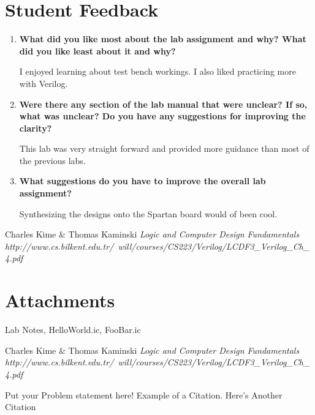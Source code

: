\documentclass[a4paper,12pt]{article}
\begin{document}
\section*{Student Feedback}

\begin{enumerate}
  \item \textbf{What did you like most about the lab assignment and why? What did you like least about it and why?}

  I enjoyed learning about test bench workings. I also liked practicing more with Verilog.

  \item \textbf{Were there any section of the lab manual that were unclear? If so, what was unclear? Do you have any suggestions for improving the clarity?}

  This lab was very straight forward and provided more guidance than most of the previous labs.

  \item \textbf{What suggestions do you have to improve the overall lab assignment?}

  Synthesizing the designs onto the Spartan board would of been cool.

\end{enumerate}

\ifx
\begin{thebibliography}{1}
 Charles Kime \& Thomas Kaminski  \emph{Logic and Computer Design Fundamentals} \\ \hspace{15pt}\textit{http://www.cs.bilkent.edu.tr/~will/courses/CS223/Verilog/LCDF3_Verilog_Ch_4.pdf}
\end{thebibliography}

\section*{Attachments}
Lab Notes, HelloWorld.ic, FooBar.ic

\begin{thebibliography}{9}
 Charles Kime & Thomas Kaminski  \emph{Logic and Computer Design Fundamentals} \textit{http://www.cs.bilkent.edu.tr/~will/courses/CS223/Verilog/LCDF3_Verilog_Ch_4.pdf}
\end{thebibliography}

Put your Problem statement here! Example of a Citation\cite[p.219]{Robotics}. Here's Another Citation\cite{Flueck}
\fi
\end{document}
